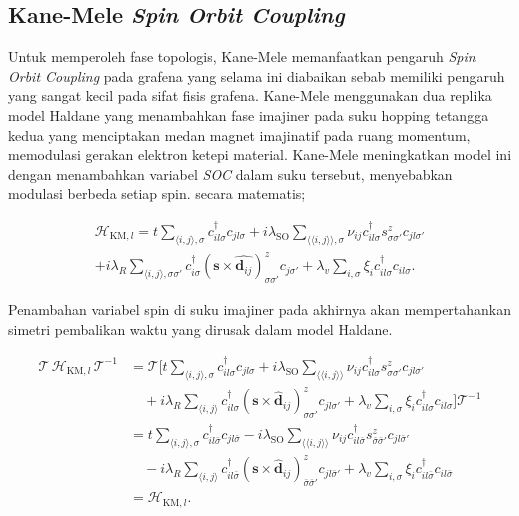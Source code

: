 \subsection{Kane-Mele \textit{Spin Orbit Coupling}}
\justifying
Untuk memperoleh fase topologis, Kane-Mele\parencite{PhysRevLett.95.226801} memanfaatkan pengaruh \textit{Spin Orbit Coupling} pada grafena yang selama ini diabaikan sebab memiliki pengaruh yang sangat kecil pada sifat fisis grafena. Kane-Mele menggunakan dua replika model Haldane\citep {PhysRevLett.61.2015} yang menambahkan fase imajiner pada suku hopping tetangga kedua yang menciptakan medan magnet imajinatif pada ruang momentum, memodulasi gerakan elektron ketepi material. Kane-Mele meningkatkan model ini dengan menambahkan variabel \textit{SOC} dalam suku tersebut, menyebabkan modulasi berbeda setiap spin. secara matematis;

\[
  \begin{align}
  \mathcal{H}_{\text{KM},l} = t \sum_{\langle i,j \rangle,\sigma} c_{il\sigma}^\dagger c_{jl\sigma} 
+ i\lambda_{\text{SO}} \sum_{\langle\langle i,j \rangle\rangle,\sigma} \nu_{ij} c_{il\sigma}^\dagger s^z_{\sigma\sigma'} c_{jl\sigma'} \\
    + i\lambda_R \sum_{\langle i,j \rangle, \sigma \sigma'} c_{i\sigma}^\dagger (\mathbf{s} \times \hat{\mathbf{d}_{ij}})^z_{\sigma \sigma'}c_{j\sigma'}
+ \lambda_v \sum_{i,\sigma} \xi_i c_{il\sigma}^\dagger c_{il\sigma}.
\end{align}
\]

\par
Penambahan variabel spin di suku imajiner pada akhirnya akan mempertahankan simetri pembalikan waktu yang dirusak dalam model Haldane.

\[
\begin{align}
\mathcal{T} \, \mathcal{H}_{\mathrm{KM},l} \, \mathcal{T}^{-1}
&= \mathcal{T} \Bigg[
t \sum_{\langle i,j \rangle,\sigma} c_{il\sigma}^\dagger c_{jl\sigma}
+ i\lambda_{\mathrm{SO}} \sum_{\langle\langle i,j \rangle\rangle}
\nu_{ij} c_{il\sigma}^\dagger s^z_{\sigma\sigma'} c_{jl\sigma'} \nonumber \\
&\quad + i\lambda_R \sum_{\langle i,j \rangle}
c_{il\sigma}^\dagger (\mathbf{s} \times \hat{\mathbf{d}}_{ij})^z_{\sigma\sigma'} c_{jl\sigma'}
+ \lambda_v \sum_{i,\sigma} \xi_i c_{il\sigma}^\dagger c_{il\sigma}
\Bigg] \mathcal{T}^{-1} \\
&= t \sum_{\langle i,j \rangle,\sigma} c_{il\bar{\sigma}}^\dagger c_{jl\bar{\sigma}}
- i\lambda_{\mathrm{SO}} \sum_{\langle\langle i,j \rangle\rangle}
\nu_{ij} c_{il\bar{\sigma}}^\dagger s^z_{\bar{\sigma}\bar{\sigma}'} c_{jl\bar{\sigma}'} \nonumber \\
&\quad - i\lambda_R \sum_{\langle i,j \rangle}
c_{il\bar{\sigma}}^\dagger (\mathbf{s} \times \hat{\mathbf{d}}_{ij})^z_{\bar{\sigma}\bar{\sigma}'} c_{jl\bar{\sigma}'}
+ \lambda_v \sum_{i,\sigma} \xi_i c_{il\bar{\sigma}}^\dagger c_{il\bar{\sigma}} \\
&= \mathcal{H}_{\mathrm{KM},l}.
\end{align}
\]



